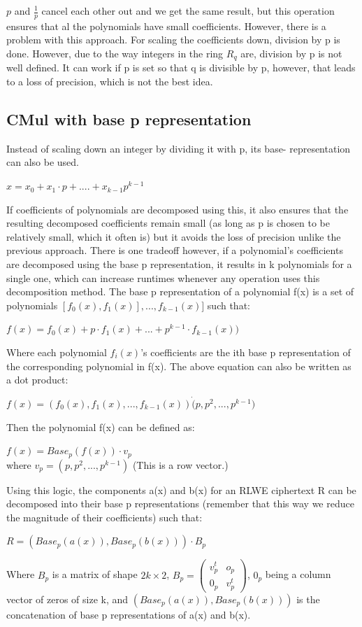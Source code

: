 \documentclass{report}
\begin{document}
	$p$ and $\frac{1}{p}$ cancel each other out and we get the same result, but this operation ensures that al the polynomials have small coefficients. However, there is a problem with this approach. For scaling the coefficients down, division by p is done. However, due to the way integers in the ring $R_q$ are, division by p is not well defined. It can work if p is set so that q is divisible by p, however, that leads to a loss of precision, which is not the best idea.
	
	\subsection{CMul with base p representation}
	Instead of scaling down an integer by dividing it with p, its base- representation can also be used.
	\begin{center}
		$x = x_0 + x_1 \cdot p + .... + x_{k-1}p^{k-1}$
	\end{center}
	If coefficients of polynomials are decomposed using this, it also ensures that the resulting decomposed coefficients remain small (as long as p is chosen to be relatively small, which it often is) but it avoids the loss of precision unlike the previous approach. There is one tradeoff however, if a polynomial's coefficients are decomposed using the base p representation, it results in k polynomials for a single one, which can increase runtimes whenever any operation uses this decomposition method. The base p representation of a polynomial f(x) is a set of polynomials $[f_0(x), f_1(x)], ..., f_{k-1}(x)]$ such that:
	\begin{center}
		$f(x) = f_0(x) + p \cdot f_1(x) + ...+ p^{k-1} \cdot f_{k-1}(x))$
	\end{center}
	Where each polynomial $f_i(x)$'s coefficients are the ith base p representation of the corresponding polynomial in f(x). The above equation can also be written as a dot product:
	\begin{center}
		$f(x) = (f_0(x), f_1(x), ..., f_{k-1}(x)) \dot (p, p^2, ..., p^{k-1})$
	\end{center}
	Then the polynomial f(x) can be defined as:
	\begin{center}
		$f(x) = Base_p(f(x)) \cdot v_p$\\
		where $v_p = (p, p^2, ..., p^{k-1})$ (This is a row vector.)
	\end{center}
	
	Using this logic, the components a(x) and b(x) for an RLWE ciphertext R can be decomposed into their base p representations (remember that this way we reduce the magnitude of their coefficients) such that:
	\begin{center}
		$R = (Base_p(a(x)), Base_p(b(x))) \cdot B_p$
	\end{center}
	Where $B_p$ is a matrix of shape $2k \times 2$, $B_p = \begin{pmatrix}
		v_p^t & o_p \\
		0_p & v_p^t
	\end{pmatrix}$, $0_p$ being a column vector of zeros of size k, and $(Base_p(a(x)), Base_p(b(x)))$ is the concatenation of base p representations of a(x) and b(x).  \newline
	
\end{document}
